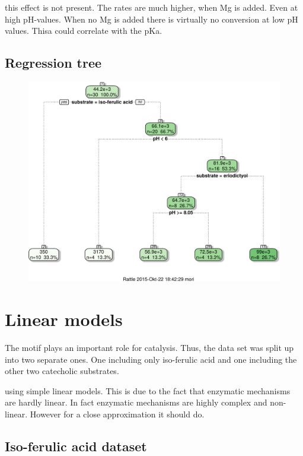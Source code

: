 \documentclass[]{tufte-handout}
\begin{document}
 this effect is not present. The rates
are much higher, when Mg is added. Even at high pH-values. When no Mg is
added there is virtually no conversion at low pH values. Thisa could
correlate with the pKa.

\subsection{Regression tree}\label{regression-tree}

\begin{figure}
 \includegraphics{analysis_tufte_files/figure-latex/unnamed-chunk-6-1.pdf}
\end{figure}

\section{Linear models}\label{linear-models}

The motif plays an important role for catalysis. Thus, the data set was
split up into two separate ones. One including only iso-ferulic acid and
one including the other two catecholic substrates.

 using simple linear
models. This is due to the fact that enzymatic mechanisms are hardly
linear. In fact enzymatic mechanisms are highly complex and non-linear.
However for a close approximation it should do.

\subsection{Iso-ferulic acid dataset}\label{iso-ferulic-acid-dataset}
\end{document}
